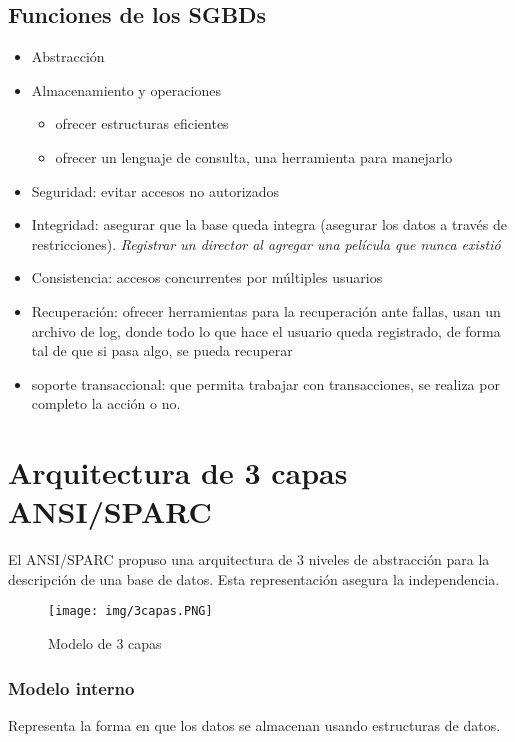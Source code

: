 \subsection*{Funciones de los SGBDs}
\begin{itemize}
\item Abstracción
\item Almacenamiento y operaciones
\begin{itemize}
 \item ofrecer estructuras eficientes
 \item ofrecer un lenguaje de consulta, una herramienta para manejarlo \end{itemize}
\item Seguridad: evitar accesos no autorizados
\item Integridad: asegurar que la base queda integra (asegurar los datos a través de restricciones). \textit{Registrar un director al agregar una película que nunca existió}
\item Consistencia:  accesos concurrentes por múltiples usuarios
\item Recuperación: ofrecer herramientas para la recuperación ante fallas, usan un archivo de log, donde todo lo que hace el usuario queda registrado, de forma tal de que si pasa algo, se pueda recuperar
\item soporte transaccional: que permita trabajar con transacciones, se realiza por completo la acción o no.
\end{itemize}




\section{Arquitectura de 3 capas ANSI/SPARC}

El ANSI/SPARC propuso una arquitectura de 3 niveles de abstracción para la descripción de una base de datos. Esta representación asegura la independencia.

\begin{figure}[!htb]
    \centering
    \texttt{[image: img/3capas.PNG]}
    \caption{Modelo de 3 capas}
\end{figure}


\subsubsection*{Modelo interno}
Representa la forma en que los datos se almacenan usando estructuras de datos.

